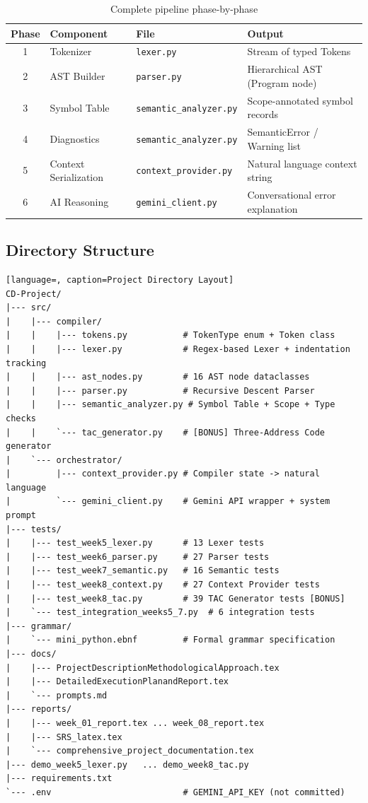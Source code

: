 \documentclass[a4paper,11pt]{article}
\begin{document}
\begin{table}[h!]
\centering
\begin{tabularx}{\textwidth}{|c|l|l|X|}
\hline
\rowcolor{blue!10}
\textbf{Phase} & \textbf{Component} & \textbf{File} & \textbf{Output} \\
\hline
1 & Tokenizer & \texttt{lexer.py} & Stream of typed Tokens \\
\hline
2 & AST Builder & \texttt{parser.py} & Hierarchical AST (Program node) \\
\hline
3 & Symbol Table & \texttt{semantic\_analyzer.py} & Scope-annotated symbol records \\
\hline
4 & Diagnostics & \texttt{semantic\_analyzer.py} & SemanticError / Warning list \\
\hline
5 & Context Serialization & \texttt{context\_provider.py} & Natural language context string \\
\hline
6 & AI Reasoning & \texttt{gemini\_client.py} & Conversational error explanation \\
\hline
\end{tabularx}
\caption{Complete pipeline phase-by-phase}
\end{table}

\subsection{Directory Structure}

\begin{lstlisting}[language=, caption=Project Directory Layout]
CD-Project/
|--- src/
|    |--- compiler/
|    |    |--- tokens.py           # TokenType enum + Token class
|    |    |--- lexer.py            # Regex-based Lexer + indentation tracking
|    |    |--- ast_nodes.py        # 16 AST node dataclasses
|    |    |--- parser.py           # Recursive Descent Parser
|    |    |--- semantic_analyzer.py # Symbol Table + Scope + Type checks
|    |    `--- tac_generator.py    # [BONUS] Three-Address Code generator
|    `--- orchestrator/
|         |--- context_provider.py # Compiler state -> natural language
|         `--- gemini_client.py    # Gemini API wrapper + system prompt
|--- tests/
|    |--- test_week5_lexer.py      # 13 Lexer tests
|    |--- test_week6_parser.py     # 27 Parser tests
|    |--- test_week7_semantic.py   # 16 Semantic tests
|    |--- test_week8_context.py    # 27 Context Provider tests
|    |--- test_week8_tac.py        # 39 TAC Generator tests [BONUS]
|    `--- test_integration_weeks5_7.py  # 6 integration tests
|--- grammar/
|    `--- mini_python.ebnf         # Formal grammar specification
|--- docs/
|    |--- ProjectDescriptionMethodologicalApproach.tex
|    |--- DetailedExecutionPlanandReport.tex
|    `--- prompts.md
|--- reports/
|    |--- week_01_report.tex ... week_08_report.tex
|    |--- SRS_latex.tex
|    `--- comprehensive_project_documentation.tex
|--- demo_week5_lexer.py   ... demo_week8_tac.py
|--- requirements.txt
`--- .env                          # GEMINI_API_KEY (not committed)
\end{lstlisting}
\end{document}
